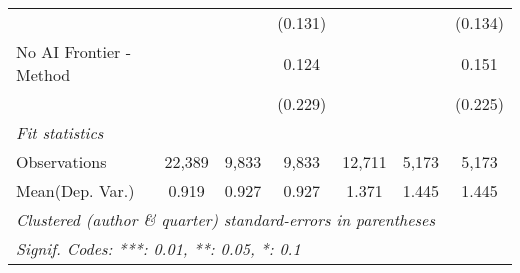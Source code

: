 \begin{tabular}{lcccccc}
                           &               &               & (0.131)       &               &               & (0.134)\\   
   No AI Frontier - Method &               &               & 0.124         &               &               & 0.151\\   
                           &               &               & (0.229)       &               &               & (0.225)\\   
   \midrule
   \emph{Fit statistics}\\
   Observations            & 22,389        & 9,833         & 9,833         & 12,711        & 5,173         & 5,173\\  
Mean(Dep. Var.) & 0.919 & 0.927 & 0.927 & 1.371 & 1.445 & 1.445 \\
   \midrule \midrule
   \multicolumn{7}{l}{\emph{Clustered (author \& quarter) standard-errors in parentheses}}\\
   \multicolumn{7}{l}{\emph{Signif. Codes: ***: 0.01, **: 0.05, *: 0.1}}\\
\end{tabular}
\par\endgroup
